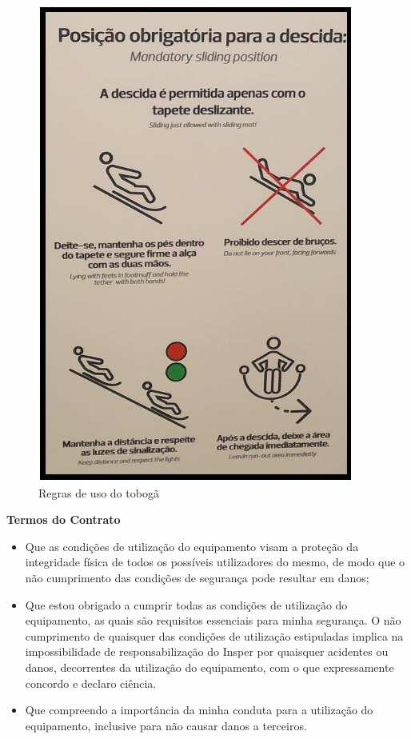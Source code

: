 \documentclass[a4paper,12pt]{article}[abntex2]
\begin{document}
\begin{figure}[H]
    \centering
    \caption{Regras de uso do tobogã}
    \includegraphics[width=0.75\linewidth]{Imagens/aps1i1.png}
\end{figure}

\textbf{Termos do Contrato}\begin{itemize}
    \item Que as condições de utilização do equipamento visam a proteção da integridade física de todos os possíveis utilizadores do mesmo, de modo que o não cumprimento das condições de segurança pode resultar em danos;

    \item Que estou obrigado a cumprir todas as condições de utilização do equipamento, as quais são requisitos essenciais para minha segurança. O não cumprimento de quaisquer das condições de utilização estipuladas implica na impossibilidade de responsabilização do Insper por quaisquer acidentes ou danos, decorrentes da utilização do equipamento, com o que expressamente concordo e declaro ciência.

    \item Que compreendo a importância da minha conduta para a utilização do equipamento, inclusive para não causar danos a terceiros.
\end{itemize}
\end{document}
